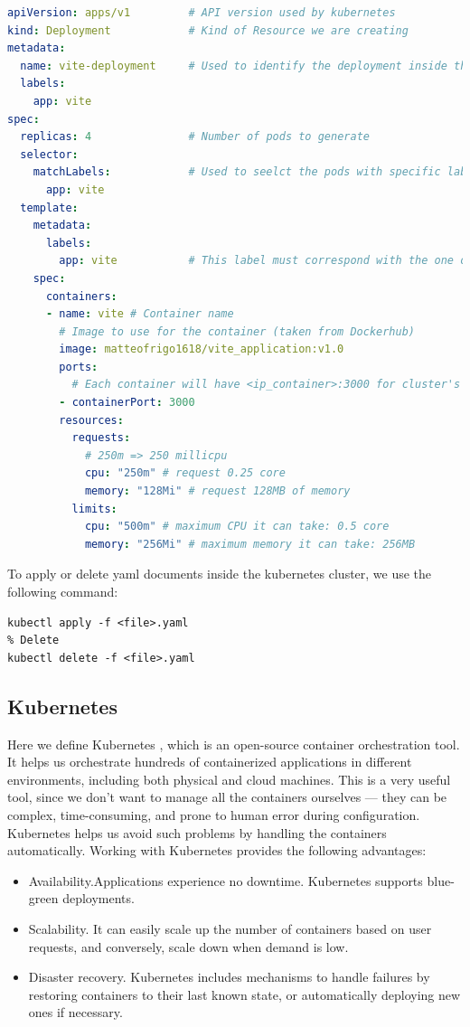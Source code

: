 \begin{lstlisting}[language=yaml, caption={Example deployment of four pods, one container each}, label={lst:yaml_default}]
apiVersion: apps/v1         # API version used by kubernetes
kind: Deployment            # Kind of Resource we are creating
metadata:
  name: vite-deployment     # Used to identify the deployment inside the cluster
  labels:
    app: vite
spec:
  replicas: 4               # Number of pods to generate
  selector:
    matchLabels:            # Used to seelct the pods with specific label
      app: vite
  template:
    metadata:
      labels:
        app: vite           # This label must correspond with the one of "selector"
    spec:
      containers:
      - name: vite # Container name
        # Image to use for the container (taken from Dockerhub)
        image: matteofrigo1618/vite_application:v1.0 
        ports: 
          # Each container will have <ip_container>:3000 for cluster's internal communication
        - containerPort: 3000
        resources:
          requests:
            # 250m => 250 millicpu
            cpu: "250m" # request 0.25 core
            memory: "128Mi" # request 128MB of memory
          limits:
            cpu: "500m" # maximum CPU it can take: 0.5 core
            memory: "256Mi" # maximum memory it can take: 256MB
\end{lstlisting}
To apply or delete yaml documents inside the kubernetes cluster, we use the following command:
\begin{lstlisting}[caption={Add or remove YAML document}]
% Apply
kubectl apply -f <file>.yaml
% Delete
kubectl delete -f <file>.yaml
\end{lstlisting}

\subsection{Kubernetes}
\label{subsec:kubernetes}
Here we define Kubernetes \cite{kubernetes2019kubernetes}, which is an open-source container orchestration tool. It helps us orchestrate hundreds of containerized applications in different environments, including both physical and cloud machines. This is a very useful tool, since we don't want to manage all the containers ourselves — they can be complex, time-consuming, and prone to human error during configuration. Kubernetes helps us avoid such problems by handling the containers automatically.
Working with Kubernetes provides the following advantages:
\begin{itemize}
    \item Availability.Applications experience no downtime. Kubernetes supports blue-green deployments.
    \item Scalability. It can easily scale up the number of containers based on user requests, and conversely, scale down when demand is low.
    \item Disaster recovery. Kubernetes includes mechanisms to handle failures by restoring containers to their last known state, or automatically deploying new ones if necessary.
\end{itemize}

